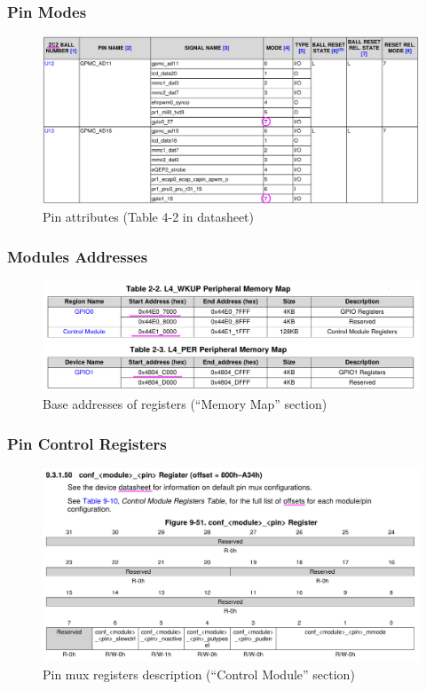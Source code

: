 \begin{frame}
  \frametitle{Pin Modes}
    \begin{figure}
      \centering
      \includegraphics[scale=0.4]{images/pin-modes.png}
      \caption{Pin attributes (Table 4-2 in datasheet)}
  \end{figure}
  \vspace*{-10mm}
\end{frame}

\begin{frame}
  \frametitle{Modules Addresses}
    \begin{figure}
      \centering
      \includegraphics[scale=0.3]{images/regs-base.png}
      \caption{Base addresses of registers (``Memory Map'' section)}
  \end{figure}
\end{frame}

\begin{frame}
  \frametitle{Pin Control Registers}
    \begin{figure}
      \centering
      \includegraphics[scale=0.3]{images/conf-reg.png}
      \caption{Pin mux registers description (``Control Module'' section)}
  \end{figure}
  \vspace*{-10mm}
\end{frame}

